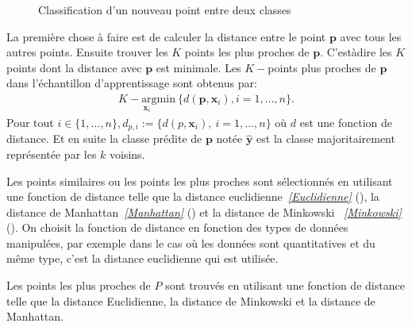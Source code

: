 \documentclass[letterpaper,11pt,english]{sphinxmanual}
\begin{document}
\begin{figure}[H]
\centering
\capstart

\noindent{}
\caption{Classification d’un nouveau point entre deux classes}\label{\detokenize{chapter3:id10}}\end{figure}

\sphinxAtStartPar
La première chose à faire est de calculer la distance entre le point
\(\textbf{p}\) avec tous les autres points. Ensuite trouver les
\(K\) points les plus proches de \(\textbf{p}\). C’est\sphinxhyphen{}à\sphinxhyphen{}dire
les \(K\) points dont la distance avec \(\textbf{p}\) est
minimale. Les \(K-\)points plus proches de \(\textbf{p}\) dans
l’échantillon d’apprentissage sont obtenus par:
\begin{equation}\label{equation:chapter3:chapter3:22}
\begin{split}\underset{\mathbf{x}_i}{K-\mbox{argmin}}\  \{d(\textbf{p},\mathbf{x}_i), i=1, \dots, n\}.\end{split}
\end{equation}
\sphinxAtStartPar
Pour tout
\(i \in \{1, \dots, n\}, d_{p, i} := \{ d(p, \mathbf{x}_i), ~ i = 1, \dots, n \}\)
où \(d\) est une fonction de distance. Et en suite la classe prédite
de \(\textbf{p}\) notée \(\hat{\textbf{y}}\) est la classe
majoritairement représentée par les \(k\) voisins.

\sphinxAtStartPar
Les points similaires ou les points les plus proches sont sélectionnés
en utilisant une fonction de distance telle que la distance
euclidienne {\hyperref[\detokenize{chapter3:Euclidienne}]{\emph{{[}Euclidienne{]}}}} (), la distance de
Manhattan {\hyperref[\detokenize{chapter3:Manhattan}]{\emph{{[}Manhattan{]}}}} () et la distance de Minkowski
 {\hyperref[\detokenize{chapter3:Minkowski}]{\emph{{[}Minkowski{]}}}} (). On choisit la fonction de distance en
fonction des types de données manipulées, par exemple dans le cas où les
données sont quantitatives et du même type, c’est la distance
euclidienne qui est utilisée.

\sphinxAtStartPar
Les points les plus proches de \(P\) sont trouvés en utilisant une
fonction de distance telle que la distance Euclidienne, la distance de
Minkowski et la distance de Manhattan.
\end{document}
